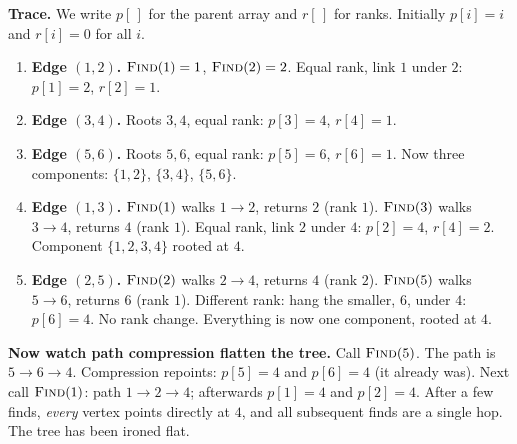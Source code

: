 \begin{labbox}
\textbf{Trace.} We write $p[\,]$ for the parent array and $r[\,]$ for ranks.
Initially $p[i]=i$ and $r[i]=0$ for all $i$.
\begin{enumerate}
  \item \textbf{Edge $(1,2)$.} $\textsc{Find}(1)=1$, $\textsc{Find}(2)=2$.
        Equal rank, link $1$ under $2$: $p[1]=2$, $r[2]=1$.
  \item \textbf{Edge $(3,4)$.} Roots $3,4$, equal rank: $p[3]=4$, $r[4]=1$.
  \item \textbf{Edge $(5,6)$.} Roots $5,6$, equal rank: $p[5]=6$, $r[6]=1$.
        Now three components: $\{1,2\}$, $\{3,4\}$, $\{5,6\}$.
  \item \textbf{Edge $(1,3)$.} $\textsc{Find}(1)$ walks $1\to 2$, returns $2$
        (rank $1$). $\textsc{Find}(3)$ walks $3\to 4$, returns $4$ (rank $1$).
        Equal rank, link $2$ under $4$: $p[2]=4$, $r[4]=2$. Component
        $\{1,2,3,4\}$ rooted at $4$.
  \item \textbf{Edge $(2,5)$.} $\textsc{Find}(2)$ walks $2\to 4$, returns $4$
        (rank $2$). $\textsc{Find}(5)$ walks $5\to 6$, returns $6$ (rank $1$).
        Different rank: hang the smaller, $6$, under $4$: $p[6]=4$. No rank
        change. Everything is now one component, rooted at $4$.
\end{enumerate}
\textbf{Now watch path compression flatten the tree.} Call $\textsc{Find}(5)$.
The path is $5 \to 6 \to 4$. Compression repoints: $p[5]=4$ and $p[6]=4$ (it
already was). Next call $\textsc{Find}(1)$: path $1 \to 2 \to 4$; afterwards
$p[1]=4$ and $p[2]=4$. After a few finds, \emph{every} vertex points directly
at $4$, and all subsequent finds are a single hop. The tree has been ironed
flat.
\end{labbox}

\begin{center}
\end{center}

